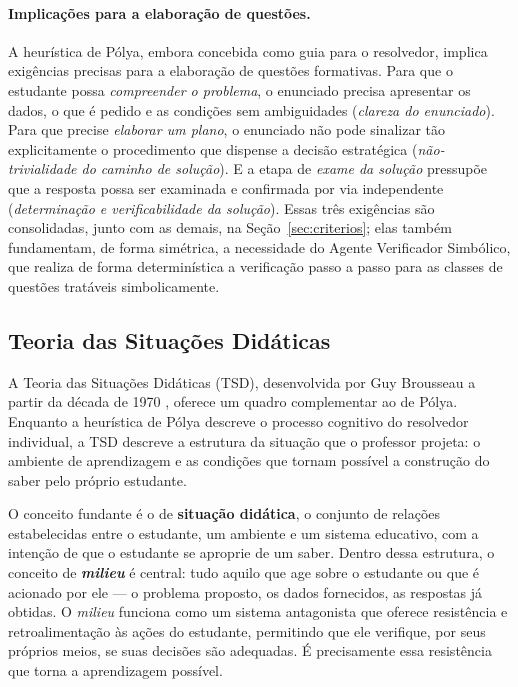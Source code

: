\paragraph{Implicações para a elaboração de questões.} A heurística de Pólya, embora concebida como
guia para o resolvedor, implica exigências precisas para a elaboração de questões formativas. Para que
o estudante possa \emph{compreender o problema}, o enunciado precisa apresentar os dados, o que é
pedido e as condições sem ambiguidades (\emph{clareza do enunciado}). Para que precise \emph{elaborar um
plano}, o enunciado não pode sinalizar tão explicitamente o procedimento que dispense a decisão
estratégica (\emph{não-trivialidade do caminho de solução}). E a etapa de \emph{exame da solução}
pressupõe que a resposta possa ser examinada e confirmada por via independente (\emph{determinação e
verificabilidade da solução}). Essas três exigências são consolidadas, junto com as demais, na
Seção~\ref{sec:criterios}; elas também fundamentam, de forma simétrica, a necessidade do Agente
Verificador Simbólico, que realiza de forma determinística a verificação passo a passo para as classes
de questões tratáveis simbolicamente.

\subsection{Teoria das Situações Didáticas}
\label{sub:tsd}

A Teoria das Situações Didáticas (TSD), desenvolvida por Guy Brousseau a partir da década de 1970
\citep{brousseau1997tsd}, oferece um quadro complementar ao de Pólya. Enquanto a heurística de Pólya
descreve o processo cognitivo do resolvedor individual, a TSD descreve a estrutura da situação que o
professor projeta: o ambiente de aprendizagem e as condições que tornam possível a construção do saber
pelo próprio estudante.

O conceito fundante é o de \textbf{situação didática}, o conjunto de relações estabelecidas entre o
estudante, um ambiente e um sistema educativo, com a intenção de que o estudante se aproprie de um
saber. Dentro dessa estrutura, o conceito de \textbf{\emph{milieu}} é central: tudo aquilo que age
sobre o estudante ou que é acionado por ele --- o problema proposto, os dados fornecidos, as respostas
já obtidas. O \emph{milieu} funciona como um sistema antagonista que oferece resistência e
retroalimentação às ações do estudante, permitindo que ele verifique, por seus próprios meios, se suas
decisões são adequadas. É precisamente essa resistência que torna a aprendizagem possível.

